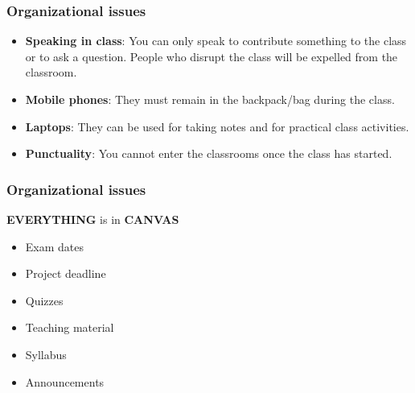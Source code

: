 \documentclass[aspectratio=169]{beamer}
\begin{document}
\begin{frame}
\frametitle{Organizational issues}
\begin{itemize}
    \item \textbf{Speaking in class}: You can only speak to contribute something to the class or to ask a question. People who disrupt the class will be expelled from the classroom. \medskip
    \item \textbf{Mobile phones}: They must remain in the backpack/bag during the class. \medskip
    \item \textbf{Laptops}: They can be used for taking notes and for practical class activities.\medskip
    \item \textbf{Punctuality}: You cannot enter the classrooms once the class has started.
\end{itemize}
\end{frame}

\begin{frame}
\frametitle{Organizational issues}
\centering
{\huge\alert{\textbf{EVERYTHING}} is in \alert{\textbf{CANVAS}}}
\vspace{1.5cm}

\hspace{0.3cm}
\begin{minipage}{0.3\textwidth}
\begin{itemize}
    \item[$\bullet$] Exam dates
    \item[$\bullet$] Project deadline
\end{itemize}
\end{minipage}
\begin{minipage}{0.3\textwidth}
\begin{itemize}
    \item[$\bullet$] Quizzes
    \item[$\bullet$] Teaching material
\end{itemize}
\end{minipage}
\begin{minipage}{0.3\textwidth}
\begin{itemize}
    \item[$\bullet$] Syllabus
    \item[$\bullet$] Announcements
\end{itemize}
\end{minipage}
\end{frame}
\end{document}
